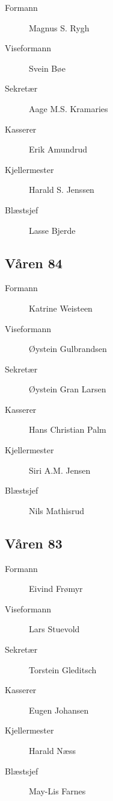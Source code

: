 {\begin{minipage}{0.6\textwidth}
\begin{description}
	\item[Formann]  Magnus S. Rygh
	\item[Viseformann] Svein Bøe
	\item[Sekretær] Aage M.S. Kramaries
	\item[Kasserer] Erik Amundrud
	\item[Kjellermester] Harald S. Jenssen
	\item[Blæstsjef] Lasse Bjerde
\end{description}
\subsection*{Våren 84}

\begin{description}
	\item[Formann]  Katrine Weisteen
	\item[Viseformann] Øystein Gulbrandsen
	\item[Sekretær] Øystein Gran Larsen
	\item[Kasserer] Hans Christian Palm
	\item[Kjellermester] Siri A.M. Jensen
	\item[Blæstsjef] Nils Mathisrud
\end{description}
\subsection*{Våren 83}

\begin{description}
	\item[Formann]  Eivind Frømyr
	\item[Viseformann] Lars Stuevold
	\item[Sekretær] Torstein Gleditsch
	\item[Kasserer] Eugen Johansen
	\item[Kjellermester] Harald Næss
	\item[Blæstsjef] May-Lis Farnes
\end{description}
\end{minipage}
}

